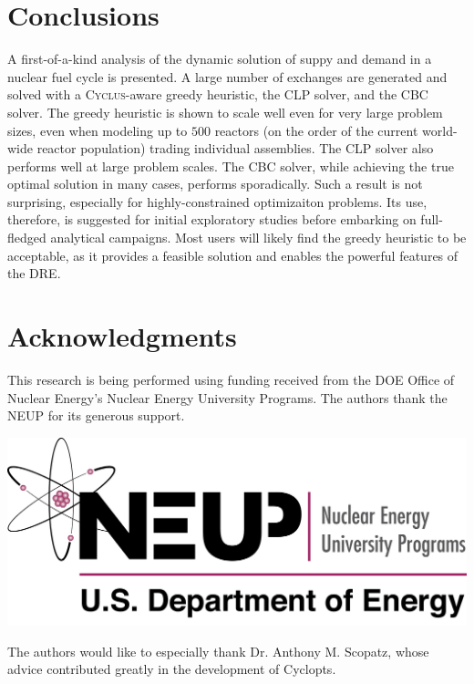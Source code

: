\documentclass{anstrans}
\newcommand{\Cyclus}{\textsc{Cyclus}}
\begin{document}
\section{Conclusions}

A first-of-a-kind analysis of the dynamic solution of suppy and demand in a
nuclear fuel cycle is presented. A large number of exchanges are generated and
solved with a \Cyclus-aware greedy heuristic, the CLP solver, and the CBC
solver. The greedy heuristic is shown to scale well even for very large problem
sizes, even when modeling up to $500$ reactors (on the order of the current
world-wide reactor population) trading individual assemblies. The CLP solver
also performs well at large problem scales. The CBC solver, while achieving the
true optimal solution in many cases, performs sporadically. Such a result is not
surprising, especially for highly-constrained optimizaiton problems. Its use,
therefore, is suggested for initial exploratory studies before embarking on
full-fledged analytical campaigns. Most users will likely find the greedy
heuristic to be acceptable, as it provides a feasible solution and enables the
powerful features of the DRE.


\section{Acknowledgments}

This research is being performed using funding received from the DOE
Office of Nuclear Energy's Nuclear Energy University Programs.  The
authors thank the NEUP for its generous support.

\begin{center}
\includegraphics[width=.25\columnwidth]{neup_logo_large.jpg}
\end{center}

The authors would like to especially thank Dr. Anthony M. Scopatz, whose advice
contributed greatly in the development of Cyclopts.



\end{document}
